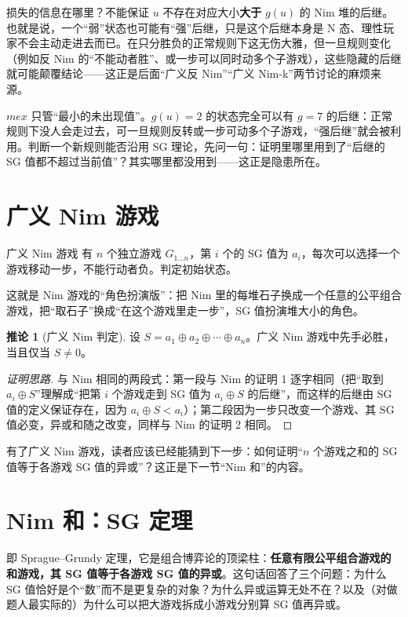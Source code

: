 \documentclass[UTF8,a4paper,11pt,oneside,openany,fontset=fandol]{ctexbook}
\theoremstyle{definition}
\newtheorem{corollary}[definition]{推论}
\begin{document}
损失的信息在哪里？不能保证 $u$ 不存在对应大小\textbf{大于} $g(u)$ 的 Nim 堆的后继。也就是说，一个“弱”状态也可能有“强”后继，只是这个后继本身是 N 态、理性玩家不会主动走进去而已。在只分胜负的正常规则下这无伤大雅，但一旦规则变化（例如反 Nim 的“不能动者胜”、或一步可以同时动多个子游戏），这些隐藏的后继就可能颠覆结论——这正是后面“广义反 Nim”“广义 Nim-k”两节讨论的麻烦来源。

\begin{pitfall}
$mex$ 只管“最小的未出现值”。$g(u)=2$ 的状态完全可以有 $g=7$ 的后继：正常规则下没人会走过去，可一旦规则反转或一步可动多个子游戏，“强后继”就会被利用。判断一个新规则能否沿用 SG 理论，先问一句：证明里哪里用到了“后继的 SG 值都不超过当前值”？其实哪里都没用到——这正是隐患所在。
\end{pitfall}

\section{广义 Nim 游戏}
\begin{problem}{广义 Nim 游戏}
有 $n$ 个独立游戏 $G_{1\ldots n}$，第 $i$ 个的 SG 值为 $a_i$，每次可以选择一个游戏移动一步，不能行动者负。判定初始状态。
\end{problem}

这就是 Nim 游戏的“角色扮演版”：把 Nim 里的每堆石子换成一个任意的公平组合游戏，把“取石子”换成“在这个游戏里走一步”，SG 值扮演堆大小的角色。

\begin{corollary}[广义 Nim 判定]
设 $S=a_1\oplus a_2\oplus\cdots\oplus a_n$。广义 Nim 游戏中先手必胜，当且仅当 $S\ne0$。
\end{corollary}
\begin{proof}[证明思路]
与 Nim 相同的两段式：第一段与 Nim 的证明 1 逐字相同（把“取到 $a_i\oplus S$”理解成“把第 $i$ 个游戏走到 SG 值为 $a_i\oplus S$ 的后继”，而这样的后继由 SG 值的定义保证存在，因为 $a_i\oplus S<a_i$）；第二段因为一步只改变一个游戏、其 SG 值必变，异或和随之改变，同样与 Nim 的证明 2 相同。
\end{proof}

有了广义 Nim 游戏，读者应该已经能猜到下一步：如何证明“$n$ 个游戏之和的 SG 值等于各游戏 SG 值的异或”？这正是下一节“Nim 和”的内容。

\section{Nim 和：SG 定理}
即 Sprague--Grundy 定理，它是组合博弈论的顶梁柱：\textbf{任意有限公平组合游戏的和游戏，其 SG 值等于各游戏 SG 值的异或}。这句话回答了三个问题：为什么 SG 值恰好是个“数”而不是更复杂的对象？为什么异或运算无处不在？以及（对做题人最实际的）为什么可以把大游戏拆成小游戏分别算 SG 值再异或。
\end{document}
